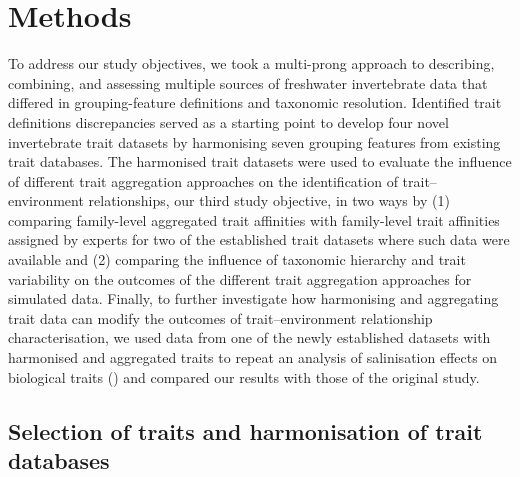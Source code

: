 \documentclass{article}
\begin{document}
\newpage

\section*{Methods}


To address our study objectives, we took a multi-prong approach to describing, combining, and assessing multiple sources of freshwater invertebrate data that differed in grouping-feature definitions and taxonomic resolution. Identified trait definitions discrepancies served as a starting point to develop four novel invertebrate trait datasets by harmonising seven grouping features from existing trait databases. The harmonised trait datasets were used to evaluate the influence of different trait aggregation approaches on the identification of trait–environment relationships, our third study objective, in two ways by (1) comparing family-level aggregated trait affinities with family-level trait affinities assigned by experts for two of the established trait datasets where such data were available and (2) comparing the influence of taxonomic hierarchy and trait variability on the outcomes of the different trait aggregation approaches for simulated data. Finally, to further investigate how harmonising and aggregating trait data can modify the outcomes of trait–environment relationship characterisation, we used data from one of the newly established datasets with harmonised and aggregated traits to repeat an analysis of salinisation effects on biological traits (\cite{szocs_effects_2014}) and compared our results with those of the original study.

\subsection*{Selection of traits and harmonisation of trait databases}
\end{document}
